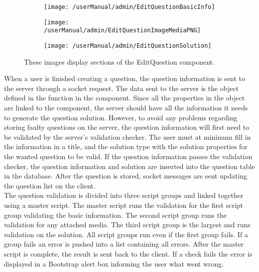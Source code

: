 \begin{figure}[H]
\centering
	\begin{subfigure}{0.45\linewidth}
        \texttt{[image: /userManual/admin/EditQuestionBasicInfo]}
        \label{fig:editQuestionBasic}
	\end{subfigure}
	\hfill
	\begin{subfigure}{0.45\linewidth}
		\texttt{[image: /userManual/admin/EditQuestionImageMediaPNG]}	
		\label{fig:editQuestionMedia}
	\end{subfigure}
	\begin{subfigure}{0.45\linewidth}
		\texttt{[image: /userManual/admin/EditQuestionSolution]}
		\label{fig:editQuestionSolution}
	\end{subfigure}
	\caption{These images display sections of the EditQuestion component.}
	\label{fig:editQuestion}
\end{figure}
\noindent
When a user is finished creating a question, the question information is sent to the server through a socket request. The data sent to the server is the  object defined in the function  in the component. Since all the properties in the  object are linked to the component, the server should have all the information it needs to generate the question solution. However, to avoid any problems regarding storing faulty questions on the server, the question information will first need to be validated by the server's validation checker. The user must at minimum fill in the information in a title, and the solution type with the solution properties for the wanted question to be valid. If the question information passes the validation checker, the question information and solution are inserted into the question table in the database. After the question is stored, socket messages are sent updating the question list on the client.
\\[11pt]
The question validation is divided into three script groups and linked together using a master script. The master script runs the validation for the first script group validating the basic information. The second script group runs the validation for any attached media. The third script group is the largest and runs validation on the solution. All script groups run even if the first group fails. If a group fails an error is pushed into a list containing all errors. After the master script is complete, the result is sent back to the client. If a check fails the error is displayed in a Bootstrap alert box informing the user what went wrong.
